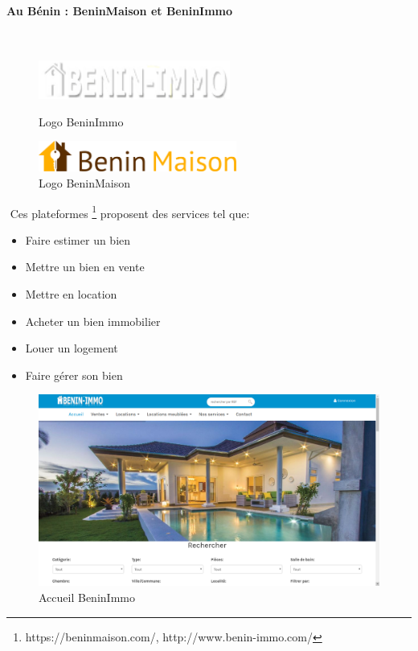 \paragraph{Au Bénin : BeninMaison et BeninImmo}
$ $
\begin{figure}[H]
    \begin{minipage}[c]{.46\linewidth}
        \centering
        \includegraphics[width=6.3cm]{images/concurrent/beninimmo2.png}
        \caption{Logo BeninImmo}
    \end{minipage}
    \hfill%
    \begin{minipage}[c]{.46\linewidth}
        \centering
        \includegraphics[width=6.5cm]{images/concurrent/beninmaison2.png}
        \caption{Logo BeninMaison}
    \end{minipage}
\end{figure}

$ $
Ces plateformes  \footnote{https://beninmaison.com/, http://www.benin-immo.com/} proposent des services tel que:
\begin{itemize}
\item[\textbullet] Faire estimer un bien
\item[\textbullet] Mettre un bien en vente
\item[\textbullet] Mettre en location
\item[\textbullet] Acheter un bien immobilier
\item[\textbullet] Louer un logement
\item[\textbullet] Faire gérer son bien
\end{itemize}

\newpage
\begin{figure}[h]
\begin{center}
\includegraphics[width=17cm]{images/concurrent/beninimmo1.png}
\end{center}
\caption{Accueil BeninImmo}
\end{figure}

